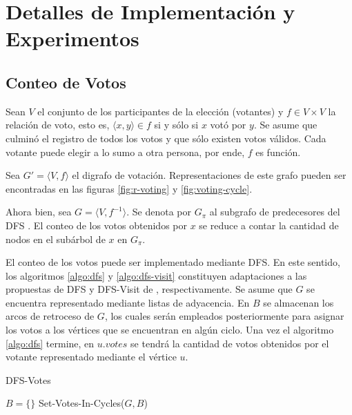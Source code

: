 \chapter{Detalles de Implementación y Experimentos}\label{chapter:implementation}



\section{Conteo de Votos}
Sean $V$ el conjunto de los participantes  de la elecci\'on (votantes) y $f \in V \times V$ la relaci\'on de voto, esto es, $ \langle x, y \rangle \in f $ si y s\'olo si $x$ vot\'o por $ y $.  Se asume que culmin\'o el registro de todos los votos y que s\'olo existen votos v\'alidos. Cada votante puede elegir a lo sumo a otra persona, por ende, $f$ es funci\'on.

Sea $G' = \langle V, f \rangle$ el digrafo de votaci\'on. Representaciones de este grafo pueden ser encontradas en las figuras \ref{fig:r-voting} y \ref{fig:voting-cycle}.

Ahora bien, sea $G = \langle V, f^{-1} \rangle$. Se denota por $G_\pi$ al subgrafo de predecesores del DFS \citep{intro-to-algo-3}. El conteo de los votos obtenidos por $x$ se reduce a contar la cantidad de nodos en el sub\'arbol de $x$ en $G_\pi$.  %

El conteo de los votos puede ser implementado mediante DFS. En este sentido, los algoritmos \ref{algo:dfs} y \ref{algo:dfs-visit} constituyen adaptaciones   a las propuestas de DFS y DFS-Visit de \cite{intro-to-algo-3}, respectivamente. Se asume que $G$ se encuentra representado mediante listas de adyacencia. En $B$ se almacenan los arcos de retroceso de $G$, los cuales ser\'an empleados posteriormente para asignar los votos a los v\'ertices que se encuentran en alg\'un ciclo.  Una vez el algoritmo \ref{algo:dfs} termine, en $u.votes$ se tendr\'a la cantidad de votos obtenidos por el votante representado mediante el v\'ertice $u$.

\begin{algorithm}[!h]
    \caption{DFS-Votes}
    \label{algo:dfs}
    \DontPrintSemicolon
    \SetAlgoLined
    \BlankLine

    $B = \{\}$\;
    Set-Votes-In-Cycles($G, B$)\; \label{algo:dfs:line:votes-in-cycles}
\end{algorithm}

